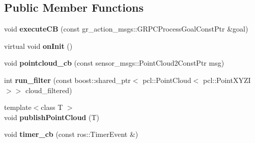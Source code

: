 \subsection*{Public Member Functions}
\begin{DoxyCompactItemize}
\item 
\mbox{\label{classgr__pointcloud__processing_1_1PointCloudProcessor_ab92eac129a63a13a2d3574e73b01cad5}} 
void {\bfseries execute\+CB} (const gr\+\_\+action\+\_\+msgs\+::\+G\+R\+P\+C\+Process\+Goal\+Const\+Ptr \&goal)
\item 
\mbox{\label{classgr__pointcloud__processing_1_1PointCloudProcessor_a0c565c3cba29275d169d556e15f4d331}} 
virtual void {\bfseries on\+Init} ()
\item 
\mbox{\label{classgr__pointcloud__processing_1_1PointCloudProcessor_a40aeaa141d4f15473b8d454fb80a5bcd}} 
void {\bfseries pointcloud\+\_\+cb} (const sensor\+\_\+msgs\+::\+Point\+Cloud2\+Const\+Ptr msg)
\item 
\mbox{\label{classgr__pointcloud__processing_1_1PointCloudProcessor_a6c7eb1093f59f46c861f469ac31a785b}} 
int {\bfseries run\+\_\+filter} (const boost\+::shared\+\_\+ptr$<$ pcl\+::\+Point\+Cloud$<$ pcl\+::\+Point\+X\+Y\+ZI $>$$>$ cloud\+\_\+filtered)
\item 
\mbox{\label{classgr__pointcloud__processing_1_1PointCloudProcessor_adcc7018e45c3a90cd3ef31185aec5de4}} 
{\footnotesize template$<$class T $>$ }\\void {\bfseries publish\+Point\+Cloud} (T)
\item 
\mbox{\label{classgr__pointcloud__processing_1_1PointCloudProcessor_a3def9c8065e4cf61108f837facc45d84}} 
void {\bfseries timer\+\_\+cb} (const ros\+::\+Timer\+Event \&)
\item 
\mbox{\label{classgr__pointcloud__processing_1_1PointCloudProcessor_aa83e45f368a262b042ff70d2fc5166e8}} 
$$
\end{DoxyCompactItemize}
